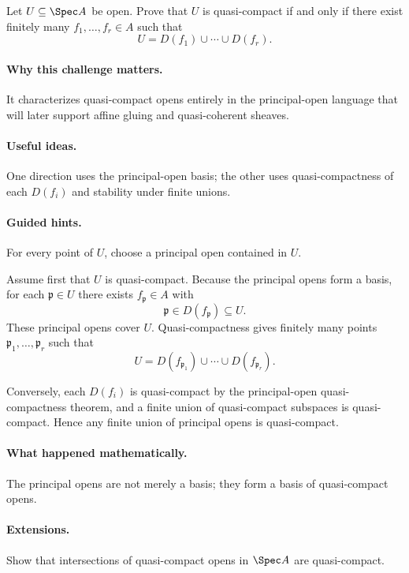 \begin{problem}
Let $U\subseteq\Spec A$ be open.  Prove that $U$ is quasi-compact if and only if there
exist finitely many $f_1,\dots,f_r\in A$ such that
\[
U=D(f_1)\cup\cdots\cup D(f_r).
\]
\end{problem}

\paragraph{Why this challenge matters.}
It characterizes quasi-compact opens entirely in the principal-open language that will later
support affine gluing and quasi-coherent sheaves.

\paragraph{Useful ideas.}
One direction uses the principal-open basis; the other uses quasi-compactness of each
$D(f_i)$ and stability under finite unions.

\paragraph{Guided hints.}
For every point of $U$, choose a principal open contained in $U$.

\begin{solution}
Assume first that $U$ is quasi-compact.  Because the principal opens form a basis, for each
$\mathfrak p\in U$ there exists $f_{\mathfrak p}\in A$ with
\[
\mathfrak p\in D(f_{\mathfrak p})\subseteq U.
\]
These principal opens cover $U$.  Quasi-compactness gives finitely many points
$\mathfrak p_1,\dots,\mathfrak p_r$ such that
\[
U=D(f_{\mathfrak p_1})\cup\cdots\cup D(f_{\mathfrak p_r}).
\]

Conversely, each $D(f_i)$ is quasi-compact by the principal-open quasi-compactness theorem,
and a finite union of quasi-compact subspaces is quasi-compact.  Hence any finite union of
principal opens is quasi-compact.
\end{solution}

\paragraph{What happened mathematically.}
The principal opens are not merely a basis; they form a basis of quasi-compact opens.

\paragraph{Extensions.}
Show that intersections of quasi-compact opens in $\Spec A$ are quasi-compact.
